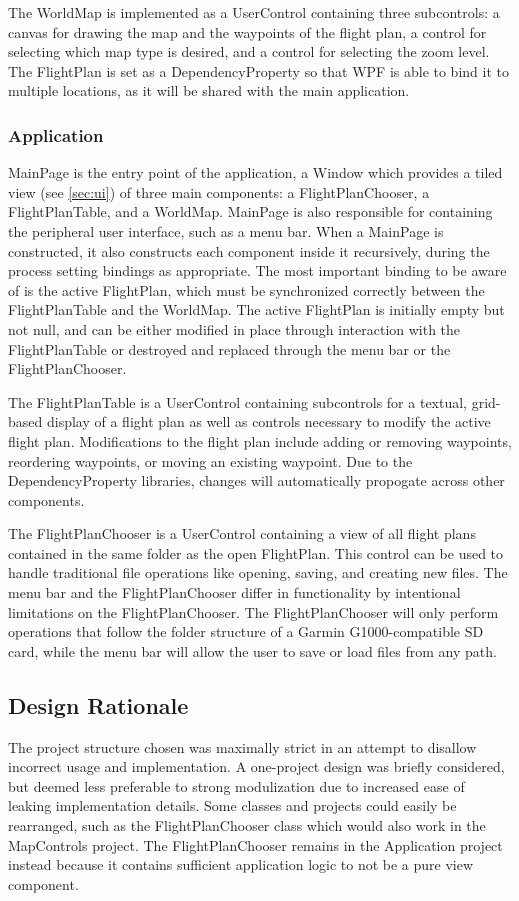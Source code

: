 \documentclass[12pt, letterpaper]{article}
\begin{document}
The WorldMap is implemented as a UserControl containing three subcontrols:
a canvas for drawing the map and the waypoints of the flight plan,
a control for selecting which map type is desired,
and a control for selecting the zoom level.
The FlightPlan is set as a DependencyProperty so that WPF is able to bind it to multiple locations, as it will be shared with the main application.

\subsubsection{Application}
MainPage is the entry point of the application, a Window which provides a tiled view (see \ref{sec:ui}) of three main components:
a FlightPlanChooser, a FlightPlanTable, and a WorldMap.
MainPage is also responsible for containing the peripheral user interface, such as a menu bar.
When a MainPage is constructed, it also constructs each component inside it recursively, during the process setting bindings as appropriate.
The most important binding to be aware of is the active FlightPlan, which must be synchronized correctly between the FlightPlanTable and the WorldMap.
The active FlightPlan is initially empty but not null,
and can be either modified in place through interaction with the FlightPlanTable or destroyed and replaced through the menu bar or the FlightPlanChooser.

The FlightPlanTable is a UserControl containing subcontrols for
  a textual, grid-based display of a flight plan as well
  as controls necessary to modify the active flight plan.
Modifications to the flight plan include adding or removing waypoints, reordering waypoints, or moving an existing waypoint.
Due to the DependencyProperty libraries, changes will automatically propogate across other components.

The FlightPlanChooser is a UserControl containing a view of all flight plans contained in the same folder as the open FlightPlan.
This control can be used to handle traditional file operations like opening, saving, and creating new files.
The menu bar and the FlightPlanChooser differ in functionality by intentional limitations on the FlightPlanChooser.
The FlightPlanChooser will only perform operations that follow the folder structure of a Garmin G1000-compatible SD card,
  while the menu bar will allow the user to save or load files from any path.

\subsection{Design Rationale}
The project structure chosen was maximally strict in an attempt to disallow incorrect usage and implementation.
A one-project design was briefly considered, but deemed less preferable to strong modulization due to increased ease of leaking implementation details.
Some classes and projects could easily be rearranged,
such as the FlightPlanChooser class which would also work in the MapControls project.
The FlightPlanChooser remains in the Application project instead because it contains sufficient application logic to not be a pure view component.
\end{document}
